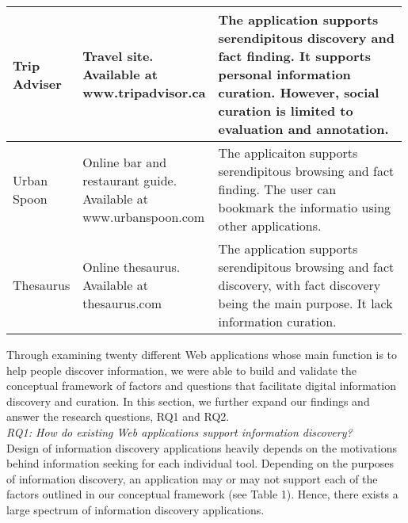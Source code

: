 \documentclass{casconpaper}
\begin{document}
{\begin{table*}[htbp]
\begin{tabular}{|p{0.11\linewidth}| p{0.22\linewidth}| p{0.66\linewidth}|}
\hline
Trip Adviser    & \raggedright Travel site. Available at www.tripadvisor.ca                                 & The application supports serendipitous discovery and fact finding. It supports personal information curation. However, social curation is limited to evaluation and annotation.                                                                                                                                 \\
\hline
Urban Spoon     & \raggedright Online bar and restaurant guide. Available at www.urbanspoon.com             & The applicaiton supports serendipitous browsing and fact finding. The user can bookmark the informatio using other applications.                                                                                                                                                                                \\
\hline
Thesaurus       & \raggedright Online thesaurus. Available at thesaurus.com                                 & The application supports serendipitous browsing and fact discovery, with fact discovery being the main purpose. It lack information curation.                                                                                \\
\hline
\end{tabular}
\end{table*}

Through examining twenty different Web applications whose main function is to help people discover information, we were able to build and validate the conceptual framework of factors and questions that facilitate digital information discovery and curation. In this section, we further expand our findings and answer the research questions, RQ1 and RQ2. \\

\emph{RQ1: How do existing Web applications support information discovery?} \\

Design of information discovery applications heavily depends on the motivations behind information seeking for each individual tool. Depending on the purposes of information discovery, an application may or may not support each of the factors outlined in our conceptual framework (see Table 1). Hence, there exists a large spectrum of information discovery applications.

}
\end{document}
